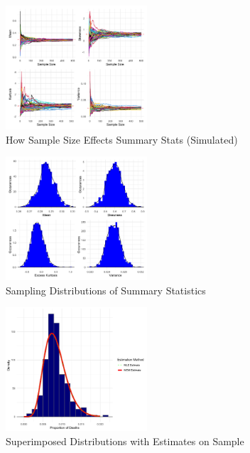 \documentclass{article}\usepackage[]{graphicx}\usepackage[]{xcolor}
\begin{document}
\begin{multicols}{2}
\begin{figure}[H]
\centering
\includegraphics[width=0.47\textwidth]{SimpSampStat}  %
\caption{How Sample Size Effects Summary Stats (Simulated)}
\label{Figure 4}
\end{figure}



\begin{figure}[H]
\centering
\includegraphics[width=0.47\textwidth]{StatDist}  %
\caption{Sampling Distributions of Summary Statistics}
\label{Figure 5}
\end{figure}

\begin{figure}[H]
\centering
\includegraphics[width=0.47\textwidth]{EstiSamp}  %
\caption{Superimposed Distributions with Estimates on Sample}
\label{Figure 6}
\end{figure}


\end{multicols}
\end{document}
